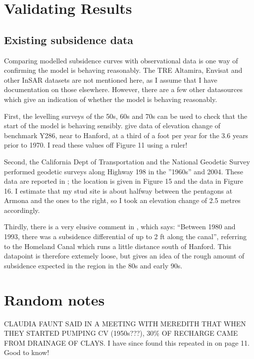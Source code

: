 \documentclass{article}
\begin{document}
\section{Validating Results}

\subsection{Existing subsidence data}

Comparing modelled subsidence curves with observational data is one way of confirming the model is behaving reasonably. The TRE Altamira, Envisat and other InSAR datasets are not mentioned here, as I assume that I have documentation on those elsewhere. However, there are a few other datasources which give an indication of whether the model is behaving reasonably.

First, the levelling surveys of the 50s, 60s and 70s can be used to check that the start of the model is behaving sensibly. \cite{poland_land_1975} give data of elevation change of benchmark Y286, near to Hanford, at a third of a foot per year for the 3.6 years prior to 1970. I read these values off Figure 11 using a ruler! 

Second, the California Dept of Transportation and the National Geodetic Survey performed geodetic surveys along Highway 198 in the ''1960s'' and 2004. These data are reported in \cite{sneed_land_2018}; the location is given in Figure 15 and the data in Figure 16. I estimate that my stud site is about halfway between the pentagons at Armona and the ones to the right, so I took an elevation change of 2.5 metres accordingly.

Thirdly, there is a very elusive comment in \cite{swanson_land_1998}, which says: ``Between 1980 and 1993, there was a subsidence differential of up to 2 ft along the canal'', referring to the Homeland Canal which runs a little distance south of Hanford. This datapoint is therefore extemely loose, but gives an idea of the rough amount of subsidence expected in the region in the 80s and early 90s. 

\section{Random notes}

CLAUDIA FAUNT SAID IN A MEETING WITH MEREDITH THAT WHEN THEY STARTED PUMPING CV (1950s???), 30\% OF RECHARGE CAME FROM DRAINAGE OF CLAYS. I have since found this repeated in \cite{sneed_hydraulic_2001} on page 11. Good to know!




\end{document}
